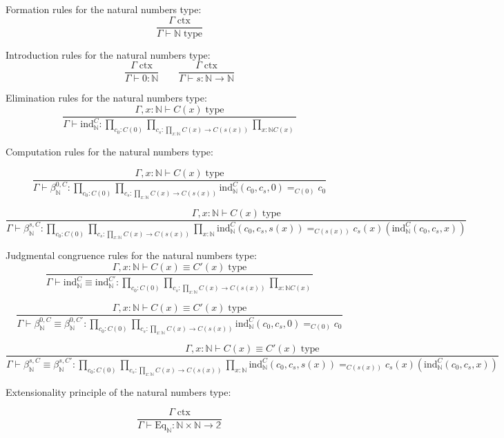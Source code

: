 \documentclass{book}
\begin{document}
Formation rules for the natural numbers type:
$$\frac{\Gamma \; \mathrm{ctx}}{\Gamma \vdash \mathbb{N} \; \mathrm{type}}$$

Introduction rules for the natural numbers type:
$$\frac{\Gamma \; \mathrm{ctx}}{\Gamma \vdash 0:\mathbb{N}} \qquad \frac{\Gamma \; \mathrm{ctx}}{\Gamma \vdash s:\mathbb{N} \to \mathbb{N}}$$

Elimination rules for the natural numbers type:
$$\frac{\Gamma, x:\mathbb{N} \vdash C(x) \; \mathrm{type}}{\Gamma \vdash \mathrm{ind}_\mathbb{N}^C:\prod_{c_0:C(0)} \prod_{c_s:\prod_{x:\mathbb{N}} C(x) \to C(s(x))} \prod_{x:\mathbb{N} C(x)}}$$

Computation rules for the natural numbers type:

$$\frac{\Gamma, x:\mathbb{N} \vdash C(x) \; \mathrm{type}}{\Gamma \vdash \beta_\mathbb{N}^{0, C}:\prod_{c_0:C(0)} \prod_{c_s:\prod_{x:\mathbb{N}} C(x) \to C(s(x))} \mathrm{ind}_\mathbb{N}^C(c_0, c_s, 0) =_{C(0)} c_0}$$

$$\frac{\Gamma, x:\mathbb{N} \vdash C(x) \; \mathrm{type}}{\Gamma \vdash \beta_\mathbb{N}^{s, C}:\prod_{c_0:C(0)} \prod_{c_s:\prod_{x:\mathbb{N}} C(x) \to C(s(x))} \prod_{x:\mathbb{N}} \mathrm{ind}_\mathbb{N}^C(c_0, c_s, s(x)) =_{C(s(x))} c_s(x)(\mathrm{ind}_\mathbb{N}^C(c_0, c_s, x))}$$

Judgmental congruence rules for the natural numbers type:
$$\frac{\Gamma, x:\mathbb{N} \vdash C(x) \equiv C'(x) \; \mathrm{type}}{\Gamma \vdash \mathrm{ind}_\mathbb{N}^C \equiv \mathrm{ind}_\mathbb{N}^{C'}:\prod_{c_0:C(0)} \prod_{c_s:\prod_{x:\mathbb{N}} C(x) \to C(s(x))} \prod_{x:\mathbb{N} C(x)}}$$

$$\frac{\Gamma, x:\mathbb{N} \vdash C(x) \equiv C'(x) \; \mathrm{type}}{\Gamma \vdash \beta_\mathbb{N}^{0, C} \equiv \beta_\mathbb{N}^{0, C'}:\prod_{c_0:C(0)} \prod_{c_s:\prod_{x:\mathbb{N}} C(x) \to C(s(x))} \mathrm{ind}_\mathbb{N}^C(c_0, c_s, 0) =_{C(0)} c_0}$$

$$\frac{\Gamma, x:\mathbb{N} \vdash C(x) \equiv C'(x) \; \mathrm{type}}{\Gamma \vdash \beta_\mathbb{N}^{s, C} \equiv \beta_\mathbb{N}^{s, C'}:\prod_{c_0:C(0)} \prod_{c_s:\prod_{x:\mathbb{N}} C(x) \to C(s(x))} \prod_{x:\mathbb{N}} \mathrm{ind}_\mathbb{N}^C(c_0, c_s, s(x)) =_{C(s(x))} c_s(x)(\mathrm{ind}_\mathbb{N}^C(c_0, c_s, x))}$$

Extensionality principle of the natural numbers type:

$$\frac{\Gamma \; \mathrm{ctx}}{\Gamma \vdash \mathrm{Eq}_\mathbb{N}:\mathbb{N} \times \mathbb{N} \to \mathbb{2}}$$
\end{document}
